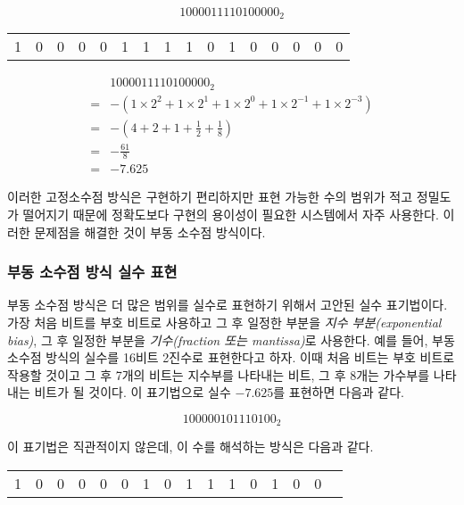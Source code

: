 \documentclass{article}
\begin{document}
$$
1 0000111 10100000_2
$$

\begin{center}
    \begin{tabular}{c|ccccccc|cccccccc}
        1 & 0 & 0 & 0 & 0 & 1 & 1 & 1 & 1 & 0 & 1 & 0 & 0 & 0 & 0 & 0
    \end{tabular}
\end{center}

$$
\begin{aligned}
    & 1000011110100000_2 \\
    =& -\left(1 \times 2^2 + 1 \times 2^1 + 1 \times 2^0 + 1 \times 2^{-1} + 1 \times 2^{-3}\right) \\
    =& -\left(4 + 2 + 1 + \frac{1}{2} + \frac{1}{8}\right) \\
    =& -\frac{61}{8} \\
    =& -7.625
\end{aligned}
$$

이러한 고정소수점 방식은 구현하기 편리하지만 표현 가능한 수의 범위가 적고 정밀도가 떨어지기
때문에 정확도보다 구현의 용이성이 필요한 시스템에서 자주 사용한다.
이러한 문제점을 해결한 것이 부동 소수점 방식이다.

\subsubsection{부동 소수점 방식 실수 표현}

부동 소수점 방식은 더 많은 범위를 실수로 표현하기 위해서 고안된 실수 표기법이다.
가장 처음 비트를 부호 비트로 사용하고 그 후 일정한 부분을 \textit{지수 부분(exponential bias)},
그 후 일정한 부분을 \textit{기수(fraction 또는 mantissa)}로 사용한다.
예를 들어, 부동 소수점 방식의 실수를 16비트 2진수로 표현한다고 하자.
이때 처음 비트는 부호 비트로 작용할 것이고 그 후 7개의 비트는 지수부를 나타내는 비트,
그 후 8개는 가수부를 나타내는 비트가 될 것이다.
이 표기법으로 실수 $-7.625$를 표현하면 다음과 같다.

$$
1 0000010 1110100_2
$$

이 표기법은 직관적이지 않은데, 이 수를 해석하는 방식은 다음과 같다.

\begin{center}
    \begin{tabular}{c|ccccccc|cccccccc}
        1 & 0 & 0 & 0 & 0 & 0 & 1 & 0 & 1 & 1 & 1 & 0 & 1 & 0 & 0
    \end{tabular}
\end{center}
\end{document}

